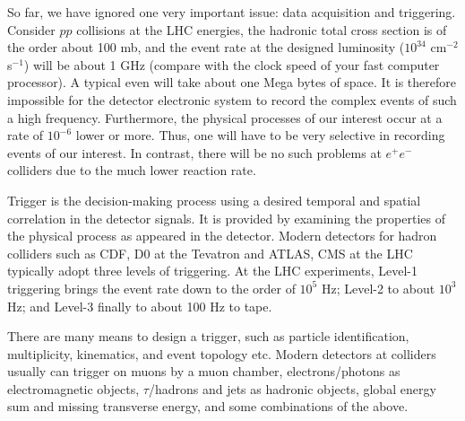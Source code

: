 \documentclass[12pt,prd,aps,floats,preprintnumbers,preprint,superscriptaddress,floatfix,nofootinbib]{revtex4}
\def\epem{e^+e^-}
\begin{document}
So far, we have ignored one very important issue: data acquisition and 
triggering.
Consider $pp$ collisions at the LHC energies, the hadronic total
cross section is of the order about 100 mb, 
and the event rate at the designed luminosity ($10^{34}$ cm$^{-2}$ s$^{-1}$)
will be about 1 GHz (compare with the clock speed of your fast 
computer processor). A typical even will take about one Mega bytes
of space. 
It is therefore impossible  for the detector electronic system to record
the complex events of such a high frequency. Furthermore,  the 
physical processes of our interest occur at a rate of $10^{-6}$ lower
or more. Thus, one will have to be very selective in recording events 
of our interest. In contrast, there will be no such problems at $\epem$
colliders due to the much lower reaction rate. 

Trigger is the decision-making process using 
a desired temporal and spatial correlation in the detector signals.
It is provided by examining the properties of the physical process
as appeared in the detector. 
Modern detectors for hadron colliders such
as CDF, D0 at the Tevatron and ATLAS, CMS at the LHC
typically adopt three levels of triggering. 
At the LHC experiments, Level-1 triggering brings
the event rate down to the order of $10^{5}$ Hz;  Level-2  to about
$10^{3}$ Hz;  and Level-3  finally to about 100 Hz to tape. 

There are many means to design a 
trigger, such as particle identification, multiplicity, kinematics, 
and event  topology etc. Modern detectors at colliders usually
can trigger on muons by a muon chamber, 
electrons/photons as electromagnetic objects,
$\tau$/hadrons and jets as hadronic objects, global energy sum
and missing transverse energy, and some combinations of the
above.
\end{document}
